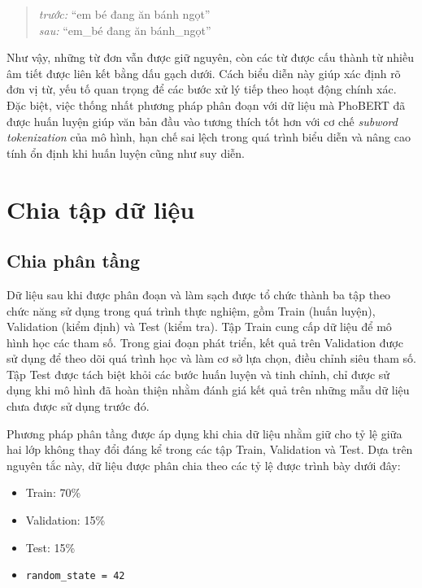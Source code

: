 \begin{quote}
\textit{trước:} ``em bé đang ăn bánh ngọt'' \\

\textit{sau:} ``em\_bé đang ăn bánh\_ngọt''
\end{quote}

Như vậy, những từ đơn vẫn được giữ nguyên, còn các từ được cấu thành từ nhiều âm tiết được liên kết bằng dấu gạch dưới. Cách biểu diễn này giúp xác định rõ đơn vị từ, yếu tố quan trọng để các bước xử lý tiếp theo hoạt động chính xác. Đặc biệt, việc thống nhất phương pháp phân đoạn với dữ liệu mà PhoBERT đã được huấn luyện giúp văn bản đầu vào tương thích tốt hơn với cơ chế \textit{subword tokenization} của mô hình, hạn chế sai lệch trong quá trình biểu diễn và nâng cao tính ổn định khi huấn luyện cũng như suy diễn.

\section{Chia tập dữ liệu}

\subsection{Chia phân tầng}
\label{sec:data_split}

Dữ liệu sau khi được phân đoạn và làm sạch được tổ chức thành ba tập theo chức năng sử dụng trong quá trình thực nghiệm, gồm Train (huấn luyện), Validation (kiểm định) và Test (kiểm tra). Tập Train cung cấp dữ liệu để mô hình học các tham số. Trong giai đoạn phát triển, kết quả trên Validation được sử dụng để theo dõi quá trình học và làm cơ sở lựa chọn, điều chỉnh siêu tham số. Tập Test được tách biệt khỏi các bước huấn luyện và tinh chỉnh, chỉ được sử dụng khi mô hình đã hoàn thiện nhằm đánh giá kết quả trên những mẫu dữ liệu chưa được sử dụng trước đó.

Phương pháp phân tầng được áp dụng khi chia dữ liệu nhằm giữ cho tỷ lệ giữa hai lớp không thay đổi đáng kể trong các tập Train, Validation và Test. Dựa trên nguyên tắc này, dữ liệu được phân chia theo các tỷ lệ được trình bày dưới đây:

\begin{itemize}[leftmargin=2em]
  \item Train: 70\%
  \item Validation: 15\%
  \item Test: 15\%
  \item \texttt{random\_state = 42}
\end{itemize}

